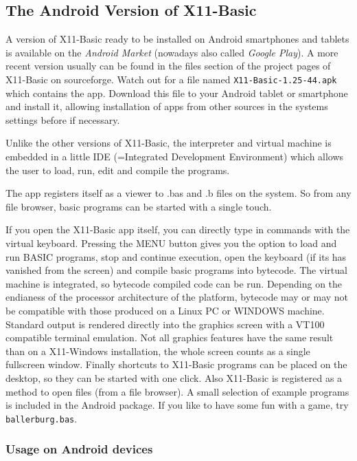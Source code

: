 \subsection{The Android Version of X11-Basic}

A version of X11-Basic ready to be installed on Android smartphones and tablets
is available on the {\it Android Market} (nowadays also called {\it Google Play}). 
A more recent version usually can be found in the files section of the project 
pages of X11-Basic on sourceforge. Watch out for a file named 
\verb|X11-Basic-1.25-44.apk| which contains the app.  Download this file to 
your Android tablet or smartphone and install it, allowing installation 
of apps from other sources in the systems settings before if necessary.

Unlike the other versions of X11-Basic, the interpreter and virtual machine is
embedded in a little IDE (=Integrated Development Environment) which allows the
user to load, run, edit and compile the programs.

The app registers itself as a viewer to .bas and .b files on the system. So
from any file browser, basic programs can be started with a single touch. 

If you open the X11-Basic app itself, you can directly type in commands with
the virtual keyboard. Pressing the MENU button gives you the option to load and
run BASIC programs, stop and continue execution, open the keyboard (if its has
vanished from the screen) and compile basic programs into bytecode. The virtual
machine is integrated, so bytecode compiled code can be run. Depending on the
endianess of the processor architecture of the platform, bytecode may or may not
be compatible with those produced on a Linux PC or WINDOWS machine. Standard
output is rendered directly into the graphics screen with a VT100 compatible
terminal emulation. Not all graphics features have the same result than on a
X11-Windows installation, the whole screen counts as a single fullscreen
window. Finally shortcuts to X11-Basic programs can be placed on the desktop,
so they can be started with one click. Also X11-Basic is registered as a method
to open files (from a file browser).  A small selection of example programs is
included in the Android package. If you like to have some fun with a game, try
\verb|ballerburg.bas|.

\subsubsection{Usage on Android devices}

